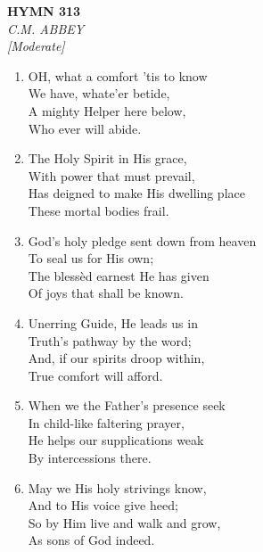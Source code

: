 \newpage
\begin{center}
    {\Large \textbf{HYMN 313}}
    \\
    \textit{C.M. ABBEY}
    \\
    \textit{\small [Moderate]}
\end{center}
\vspace{1em}

\begin{enumerate}
    \item OH, what a comfort 'tis to know \\
        We have, whate'er betide, \\
        A mighty Helper here below, \\
        Who ever will abide.

    \item The Holy Spirit in His grace, \\
        With power that must prevail, \\
        Has deigned to make His dwelling place \\
        These mortal bodies frail.

    \item God's holy pledge sent down from heaven \\
        To seal us for His own; \\
        The bless\`ed earnest He has given \\
        Of joys that shall be known.

    \item Unerring Guide, He leads us in \\
        Truth's pathway by the word; \\
        And, if our spirits droop within, \\
        True comfort will afford.

    \item When we the Father's presence seek \\
        In child-like faltering prayer, \\
        He helps our supplications weak \\
        By intercessions there.

    \item May we His holy strivings know, \\
        And to His voice give heed; \\
        So by Him live and walk and grow, \\
        As sons of God indeed.

\end{enumerate}

